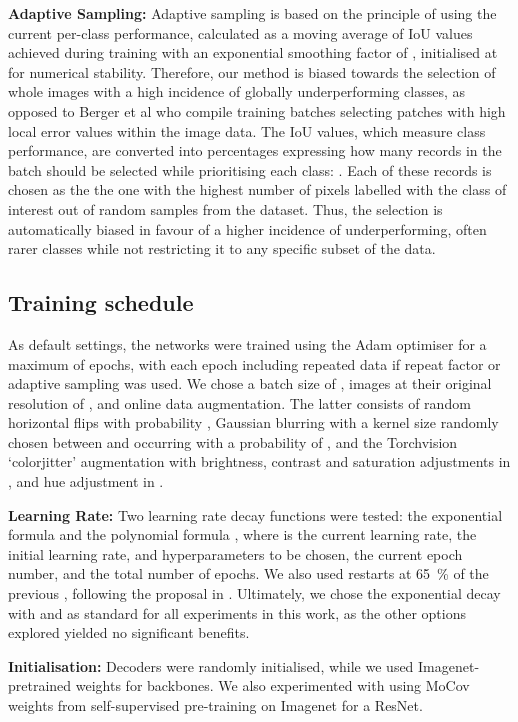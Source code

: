 \documentclass[runningheads]{llncs}
\newcommand{\tbf}[1]{\textbf{#1}}
\begin{document}
\noindent\tbf{Adaptive Sampling:}
Adaptive sampling is based on the principle of using the current per-class performance, calculated as a moving average of IoU values achieved during training with an exponential smoothing factor of , initialised at  for numerical stability. Therefore, our method is biased towards the selection of whole images with a high incidence of globally underperforming classes, as opposed to Berger et al \cite{berger2018adaptive} who compile training batches selecting patches with high local error values within the image data. The IoU values, which measure class performance, are converted into percentages expressing how many records in the batch should be selected while prioritising each class: . Each of these records is chosen as the the one with the highest number of pixels labelled with the class of interest out of  random samples from the dataset. Thus, the selection is automatically biased in favour of a higher incidence of underperforming, often rarer classes while not restricting it to any specific subset of the data.

\subsection{Training schedule}\label{methods:training}
As default settings, the networks were trained using the Adam optimiser \cite{Adam} 
for a maximum of  epochs, with each epoch including repeated data if repeat factor or adaptive sampling was used. We chose a batch size of , images at their original resolution of , and online data augmentation. The latter consists of random horizontal flips with probability , Gaussian blurring with a kernel size randomly chosen between  and  occurring with a probability of , and the Torchvision `colorjitter' augmentation with brightness, contrast and saturation adjustments in , and hue adjustment in .

\noindent\tbf{Learning Rate:}
Two learning rate decay functions were tested: the exponential formula  and the polynomial formula  \cite{polynomial}, where  is the current learning rate,  the initial learning rate,  and  hyperparameters to be chosen,  the current epoch number, and  the total number of epochs. We also used restarts at \SI{65}{\percent} of the previous , following the proposal in \cite{polynomial}. Ultimately, we chose the exponential decay with  and  as standard for all experiments in this work, as the other options explored yielded no significant benefits.

\noindent\tbf{Initialisation:}
Decoders were randomly initialised, while we used Imagenet-pretrained weights for backbones. We also experimented with using MoCov weights from self-supervised pre-training on Imagenet \cite{MoCov2} for a ResNet.
\end{document}
